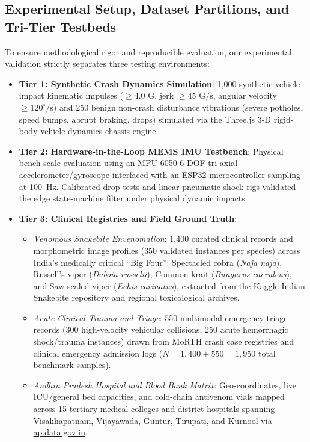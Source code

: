 \documentclass[conference]{IEEEtran}
\begin{document}
\subsection{Experimental Setup, Dataset Partitions, and Tri-Tier Testbeds}
To ensure methodological rigor and reproducible evaluation, our experimental validation strictly separates three testing environments:
\begin{itemize}
    \item \textbf{Tier 1: Synthetic Crash Dynamics Simulation}: 1,000 synthetic vehicle impact kinematic impulses ($\ge 4.0\text{ G}$, jerk $\ge 45\text{ G/s}$, angular velocity $\ge 120^\circ/\text{s}$) and 250 benign non-crash disturbance vibrations (severe potholes, speed bumps, abrupt braking, drops) simulated via the Three.js 3-D rigid-body vehicle dynamics chassis engine.
    \item \textbf{Tier 2: Hardware-in-the-Loop MEMS IMU Testbench}: Physical bench-scale evaluation using an MPU-6050 6-DOF tri-axial accelerometer/gyroscope interfaced with an ESP32 microcontroller sampling at 100~Hz. Calibrated drop tests and linear pneumatic shock rigs validated the edge state-machine filter under physical dynamic impacts.
    \item \textbf{Tier 3: Clinical Registries and Field Ground Truth}:
    \begin{itemize}
        \item \textit{Venomous Snakebite Envenomation}: 1,400 curated clinical records and morphometric image profiles ($350$ validated instances per species) across India's medically critical ``Big Four'': Spectacled cobra (\textit{Naja naja}), Russell's viper (\textit{Daboia russelii}), Common krait (\textit{Bungarus caeruleus}), and Saw-scaled viper (\textit{Echis carinatus}), extracted from the Kaggle Indian Snakebite repository and regional toxicological archives.
        \item \textit{Acute Clinical Trauma and Triage}: 550 multimodal emergency triage records (300 high-velocity vehicular collisions, 250 acute hemorrhagic shock/trauma instances) drawn from MoRTH crash case registries and clinical emergency admission logs ($N = 1,400 + 550 = 1,950$ total benchmark samples).
        \item \textit{Andhra Pradesh Hospital and Blood Bank Matrix}: Geo-coordinates, live ICU/general bed capacities, and cold-chain antivenom vials mapped across 15 tertiary medical colleges and district hospitals spanning Visakhapatnam, Vijayawada, Guntur, Tirupati, and Kurnool via \url{ap.data.gov.in}.
    \end{itemize}
\end{itemize}
\end{document}
